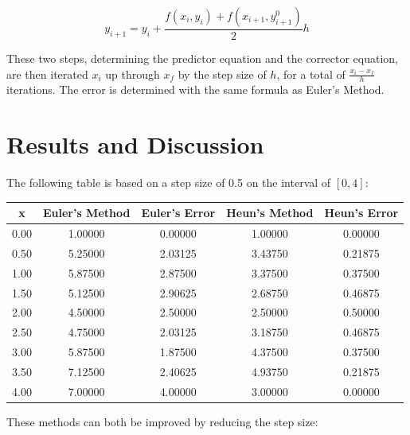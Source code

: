 \documentclass[12pt, letterpaper]{article}
\begin{document}
	\begin{equation}y_{i+1}=y_i+\frac{f(x_i, y_i)+f(x_{i+1},y_{i+1}^0)}{2}h\end{equation}
	
	These two steps, determining the predictor equation and the corrector equation, are then iterated $x_i$ up through $x_f$ by the step size of $h$, for a total of $\frac{x_i-x_f}{h}$ iterations. The error is determined with the same formula as Euler's Method.
	 

\section{\label{sec:results}Results and Discussion}
    	The following table is based on a step size of 0.5 on the interval of $[0,4]$:
	
	\begin{table}[h]
	\centering
	\begin{tabular}{c|cc|cc}
	x & Euler's Method & Euler's Error & Heun's Method & Heun's Error \\ \hline
	0.00 & 1.00000 & 0.00000 & 1.00000 & 0.00000 \\
	0.50 & 5.25000 & 2.03125 & 3.43750 & 0.21875 \\
	1.00 & 5.87500 & 2.87500 & 3.37500 & 0.37500 \\
	1.50 & 5.12500 & 2.90625 & 2.68750 & 0.46875 \\
	2.00 & 4.50000 & 2.50000 & 2.50000 & 0.50000 \\
	2.50 & 4.75000 & 2.03125 & 3.18750 & 0.46875 \\
	3.00 & 5.87500 & 1.87500 & 4.37500 & 0.37500 \\
	3.50 & 7.12500 & 2.40625 & 4.93750 & 0.21875 \\
	4.00 & 7.00000 & 4.00000 & 3.00000 & 0.00000
	\end{tabular}
	\end{table}
	
	\newpage
	These methods can both be improved by reducing the step size:
	
\end{document}
